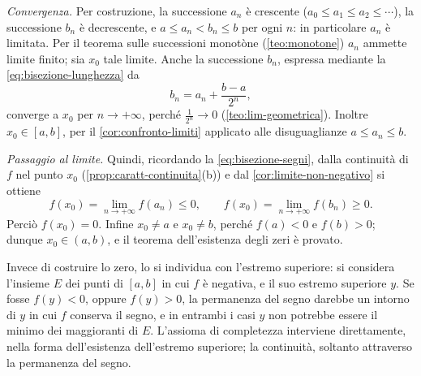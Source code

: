 \begin{dimostrazione}
\emph{Convergenza.} Per costruzione, la successione $a_{n}$ è crescente
($a_{0}\le a_{1}\le a_{2}\le\cdots$), la successione $b_{n}$ è decrescente, e
$a\le a_{n}<b_{n}\le b$ per ogni $n$: in particolare $a_{n}$ è limitata. Per il teorema
sulle successioni monotòne (\cref{teo:monotone}) $a_{n}$ ammette limite finito; sia
$x_{0}$ tale limite. Anche la successione $b_{n}$, espressa mediante la
\eqref{eq:bisezione-lunghezza} da
\begin{equation}\label{eq:bisezione-bn}
  b_{n}=a_{n}+\frac{b-a}{2^{n}},
\end{equation}
converge a $x_{0}$ per $n\to+\infty$, perché $\frac1{2^{n}}\to0$ (\cref{teo:lim-geometrica}).
Inoltre $x_{0}\in[a,b]$, per il \cref{cor:confronto-limiti} applicato alle
disuguaglianze $a\le a_{n}\le b$.

\emph{Passaggio al limite.} Quindi, ricordando la \eqref{eq:bisezione-segni}, dalla
continuità di $f$ nel punto $x_{0}$ (\cref{prop:caratt-continuita}(b)) e dal
\cref{cor:limite-non-negativo} si ottiene
\begin{equation}\label{eq:bisezione-limite}
  f(x_{0})=\lim_{n\to+\infty}f(a_{n})\le0, \qquad f(x_{0})=\lim_{n\to+\infty}f(b_{n})\ge0 .
\end{equation}
Perciò $f(x_{0})=0$. Infine $x_{0}\neq a$ e $x_{0}\neq b$, perché $f(a)<0$ e $f(b)>0$;
dunque $x_{0}\in(a,b)$, e il teorema dell'esistenza degli zeri è provato.
\end{dimostrazione}

\begin{strategia}
Invece di costruire lo zero, lo si individua con l'estremo superiore: si considera
l'insieme $E$ dei punti di $[a,b]$ in cui $f$ è negativa, e il suo estremo superiore $y$.
Se fosse $f(y)<0$, oppure $f(y)>0$, la permanenza del segno darebbe un intorno di $y$ in
cui $f$ conserva il segno, e in entrambi i casi $y$ non potrebbe essere il minimo dei
maggioranti di $E$. L'assioma di completezza interviene direttamente, nella forma
dell'esistenza dell'estremo superiore; la continuità, soltanto attraverso la permanenza
del segno.
\end{strategia}

